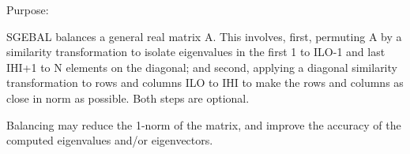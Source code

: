  \begin{DoxyParagraph}{Purpose\+: }
\begin{DoxyVerb} SGEBAL balances a general real matrix A.  This involves, first,
 permuting A by a similarity transformation to isolate eigenvalues
 in the first 1 to ILO-1 and last IHI+1 to N elements on the
 diagonal; and second, applying a diagonal similarity transformation
 to rows and columns ILO to IHI to make the rows and columns as
 close in norm as possible.  Both steps are optional.

 Balancing may reduce the 1-norm of the matrix, and improve the
 accuracy of the computed eigenvalues and/or eigenvectors.\end{DoxyVerb}
 
\end{DoxyParagraph}

